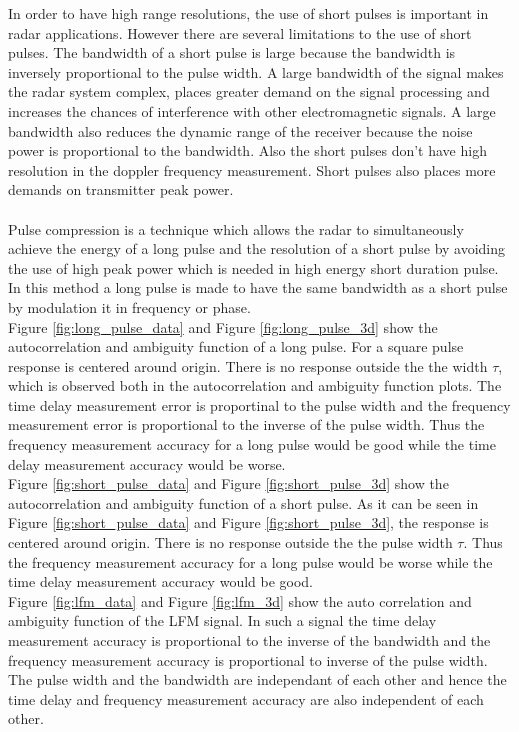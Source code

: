 \documentclass{article}
\begin{document}
In order to have high range resolutions, the use of short pulses is important in radar applications. However there are several limitations to the use of short pulses. The bandwidth of a short pulse is large because the bandwidth is inversely proportional to the pulse width. A large bandwidth of the signal makes the radar system complex, places greater demand on the signal processing and increases the chances of interference with other electromagnetic signals. A large bandwidth also reduces the dynamic range of the receiver because the noise power is proportional to the bandwidth. Also the short pulses don't have high resolution in the doppler frequency measurement. Short pulses also places more demands on transmitter peak power. \cite{Skolnik:2001irs}\\
\\
Pulse compression is a technique which allows the radar to simultaneously achieve the energy of a long pulse and the resolution of a short pulse by avoiding the use of high peak power which is needed in high energy short duration pulse. In this method a long pulse is made to have the same bandwidth as a short pulse by modulation it in frequency or phase. \cite{Skolnik:2001irs}\\

Figure \ref{fig:long_pulse_data} and Figure \ref{fig:long_pulse_3d} show the autocorrelation and ambiguity function of a long pulse. For a square pulse response is centered around origin. There is no response outside the the width $\tau$, which is observed both in the autocorrelation and ambiguity function plots. The time delay measurement error is proportinal to the pulse width and the frequency measurement error is proportional to the inverse of the pulse width. Thus the frequency measurement accuracy for a long pulse would be good while the time delay measurement accuracy would be worse. \cite{Skolnik:2001irs}\\

Figure \ref{fig:short_pulse_data} and Figure \ref{fig:short_pulse_3d} show the autocorrelation and ambiguity function of a short pulse. As it can be seen in Figure \ref{fig:short_pulse_data} and Figure \ref{fig:short_pulse_3d}, the response is centered around origin. There is no response outside the the pulse width $\tau$. Thus the frequency measurement accuracy for a long pulse would be worse while the time delay measurement accuracy would be good. \cite{Skolnik:2001irs}\\

Figure \ref{fig:lfm_data} and Figure \ref{fig:lfm_3d} show the auto correlation and ambiguity function of the LFM signal. In such a signal the time delay measurement accuracy is proportional to the inverse of the bandwidth and the frequency measurement accuracy is proportional to inverse of the pulse width.  The pulse width and the bandwidth are independant of each other and hence the time delay and frequency measurement accuracy are also independent of each other.\\
\end{document}
